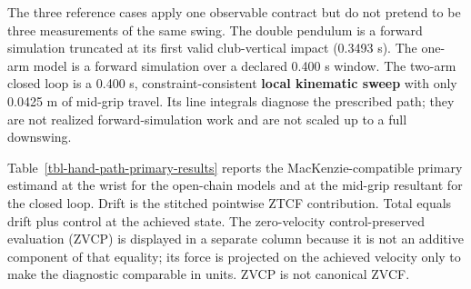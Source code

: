 \documentclass[
  letterpaper,
]{report}
\begin{document}
The three reference cases apply one observable contract but do not
pretend to be three measurements of the same swing. The double pendulum
is a forward simulation truncated at its first valid club-vertical
impact (0.3493 s). The one-arm model is a forward simulation over a
declared 0.400 s window. The two-arm closed loop is a 0.400 s,
constraint-consistent \textbf{local kinematic sweep} with only 0.0425 m
of mid-grip travel. Its line integrals diagnose the prescribed path;
they are not realized forward-simulation work and are not scaled up to a
full downswing.

Table~\ref{tbl-hand-path-primary-results} reports the
MacKenzie-compatible primary estimand at the wrist for the open-chain
models and at the mid-grip resultant for the closed loop. Drift is the
stitched pointwise ZTCF contribution. Total equals drift plus control at
the achieved state. The zero-velocity control-preserved evaluation
(ZVCP) is displayed in a separate column because it is not an additive
component of that equality; its force is projected on the achieved
velocity only to make the diagnostic comparable in units. ZVCP is not
canonical ZVCF.
\end{document}
